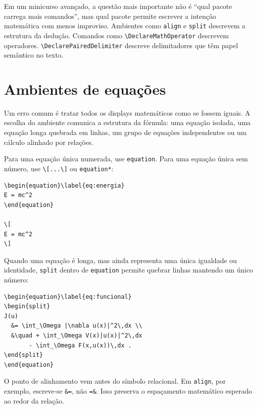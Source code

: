 Em um minicurso avançado, a questão mais importante não é ``qual pacote carrega mais comandos'', mas qual pacote permite escrever a intenção matemática com menos improviso. Ambientes como \texttt{align} e \texttt{split} descrevem a estrutura da dedução. Comandos como \verb|\DeclareMathOperator| descrevem operadores. \verb|\DeclarePairedDelimiter| descreve delimitadores que têm papel semântico no texto.

\section{Ambientes de equações}

Um erro comum é tratar todos os displays matemáticos como se fossem iguais. A escolha do ambiente comunica a estrutura da fórmula: uma equação isolada, uma equação longa quebrada em linhas, um grupo de equações independentes ou um cálculo alinhado por relações.

Para uma equação única numerada, use \texttt{equation}. Para uma equação única sem número, use \verb|\[...\]| ou \texttt{equation*}:

\begin{lstlisting}[language={[latex]TeX}, caption={Equação isolada}]
\begin{equation}\label{eq:energia}
E = mc^2
\end{equation}

\[
E = mc^2
\]
\end{lstlisting}

Quando uma equação é longa, mas ainda representa uma única igualdade ou identidade, \texttt{split} dentro de \texttt{equation} permite quebrar linhas mantendo um único número:

\begin{lstlisting}[language={[latex]TeX}, caption={Equação longa com split}]
\begin{equation}\label{eq:funcional}
\begin{split}
J(u)
  &= \int_\Omega |\nabla u(x)|^2\,dx \\
  &\quad + \int_\Omega V(x)|u(x)|^2\,dx
       - \int_\Omega F(x,u(x))\,dx .
\end{split}
\end{equation}
\end{lstlisting}

O ponto de alinhamento vem antes do símbolo relacional. Em \texttt{align}, por exemplo, escreve-se \verb|&=|, não \verb|=&|. Isso preserva o espaçamento matemático esperado ao redor da relação.


